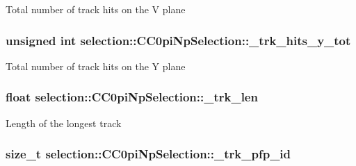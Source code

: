Total number of track hits on the V plane \hypertarget{classselection_1_1CC0piNpSelection_a76eb07fcb9190709464880c0ea7c4eba}{
\subsubsection[{\-\_\-trk\-\_\-hits\-\_\-y\-\_\-tot}]{\setlength{\rightskip}{0pt plus 5cm}unsigned int selection\-::\-C\-C0pi\-Np\-Selection\-::\-\_\-trk\-\_\-hits\-\_\-y\-\_\-tot\hspace{0.3cm}{\ttfamily [private]}}}\label{classselection_1_1CC0piNpSelection_a76eb07fcb9190709464880c0ea7c4eba}
Total number of track hits on the Y plane \hypertarget{classselection_1_1CC0piNpSelection_aab7945993678b44d7100abac6cc71655}{
\subsubsection[{\-\_\-trk\-\_\-len}]{\setlength{\rightskip}{0pt plus 5cm}float selection\-::\-C\-C0pi\-Np\-Selection\-::\-\_\-trk\-\_\-len\hspace{0.3cm}{\ttfamily [private]}}}\label{classselection_1_1CC0piNpSelection_aab7945993678b44d7100abac6cc71655}
Length of the longest track \hypertarget{classselection_1_1CC0piNpSelection_a641e7e656a28a5b31a5c8ab21dad9d3b}{
\subsubsection[{\-\_\-trk\-\_\-pfp\-\_\-id}]{\setlength{\rightskip}{0pt plus 5cm}size\-\_\-t selection\-::\-C\-C0pi\-Np\-Selection\-::\-\_\-trk\-\_\-pfp\-\_\-id\hspace{0.3cm}{\ttfamily [private]}}}\label{classselection_1_1CC0piNpSelection_a641e7e656a28a5b31a5c8ab21dad9d3b}
